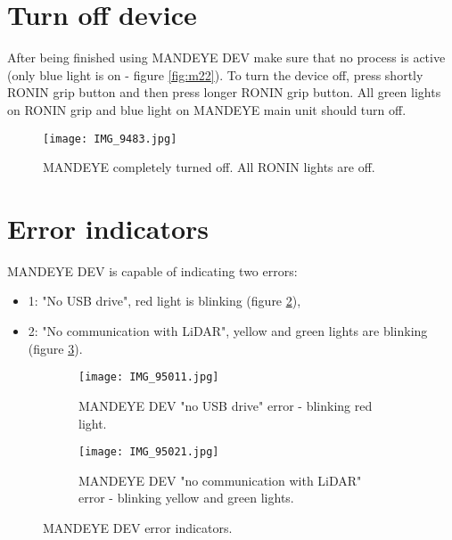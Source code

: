 \pagebreak
\section{Turn off device}
 After being finished using MANDEYE DEV make sure that no process is active (only blue light is on - figure \ref{fig:m22}). To turn the device off, press shortly RONIN grip button and then press longer RONIN grip button. All green lights on RONIN grip and blue light on MANDEYE main unit should turn off.
 \begin{figure}[H]
 	\centering
 	\texttt{[image: IMG\_9483.jpg]}
 	\caption{MANDEYE completely turned off. All RONIN lights are off.}
 	\label{fig:mandeye_hardware5}
 \end{figure}

\pagebreak
\section{Error indicators}
\label{section:errors}
MANDEYE DEV is capable of indicating two errors:
\begin{itemize}
	\item 1: "No USB drive", red light is blinking (figure \ref{fig:m61}),
	\item 2: "No communication with LiDAR", yellow and green lights are blinking (figure \ref{fig:m62}).
\end{itemize}

\begin{figure}[H]
	\centering
	\begin{subfigure}[b]{0.45\textwidth}
		\centering
		\texttt{[image: IMG\_95011.jpg]}
		\caption{MANDEYE DEV "no USB drive" error - blinking red light.}
		\label{fig:m61}
	\end{subfigure}
	\hfill
	\begin{subfigure}[b]{0.45\textwidth}
		\centering
		\texttt{[image: IMG\_95021.jpg]}
		\caption{MANDEYE DEV "no communication with LiDAR" error - blinking yellow and green lights.}
		\label{fig:m62}
	\end{subfigure}
	\caption{MANDEYE DEV error indicators.}
	\label{fig:mandeye_harware6}
\end{figure}
	
